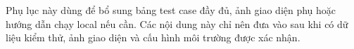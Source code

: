 \documentclass[../DoAn.tex]{subfiles}
\begin{document}
Phụ lục này dùng để bổ sung bảng test case đầy đủ, ảnh giao diện phụ hoặc hướng dẫn chạy local nếu cần. Các nội dung này chỉ nên đưa vào sau khi có dữ liệu kiểm thử, ảnh giao diện và cấu hình môi trường được xác nhận.
\end{document}
